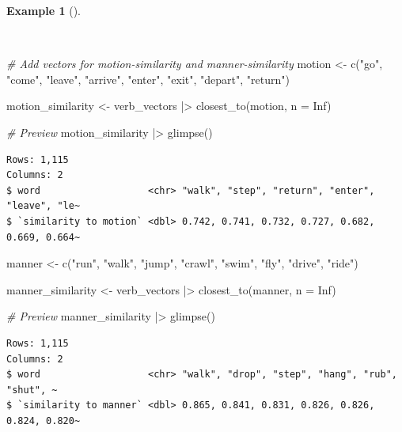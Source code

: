 \documentclass[
  letterpaper,
]{book}
\newenvironment{Shaded}{\begin{snugshade}}{\end{snugshade}}
\newcommand{\AttributeTok}[1]{\textcolor[rgb]{0.00,0.00,0.00}{#1}}
\newcommand{\CommentTok}[1]{\textcolor[rgb]{0.00,0.00,0.00}{\textit{#1}}}
\newcommand{\ConstantTok}[1]{\textcolor[rgb]{0.00,0.00,0.00}{#1}}
\newcommand{\FunctionTok}[1]{\textcolor[rgb]{0.00,0.00,0.00}{#1}}
\newcommand{\NormalTok}[1]{\textcolor[rgb]{0.00,0.00,0.00}{#1}}
\newcommand{\OtherTok}[1]{\textcolor[rgb]{0.00,0.00,0.00}{#1}}
\newcommand{\SpecialCharTok}[1]{\textcolor[rgb]{0.00,0.00,0.00}{#1}}
\newcommand{\StringTok}[1]{\textcolor[rgb]{0.00,0.00,0.00}{#1}}
\theoremstyle{definition}
\newtheorem{example}{Example}[chapter]
\theoremstyle{remark}
\begin{document}
\begin{example}[]\protect\hypertarget{exm-explore-masc-vsm-word2vec-manner-motion}{}\label{exm-explore-masc-vsm-word2vec-manner-motion}

~

\begin{Shaded}
\begin{Highlighting}[]
\CommentTok{\# Add vectors for motion{-}similarity and manner{-}similarity}
\NormalTok{motion }\OtherTok{\textless{}{-}}
  \FunctionTok{c}\NormalTok{(}\StringTok{"go"}\NormalTok{, }\StringTok{"come"}\NormalTok{, }\StringTok{"leave"}\NormalTok{, }\StringTok{"arrive"}\NormalTok{, }\StringTok{"enter"}\NormalTok{, }\StringTok{"exit"}\NormalTok{, }\StringTok{"depart"}\NormalTok{, }\StringTok{"return"}\NormalTok{)}

\NormalTok{motion\_similarity }\OtherTok{\textless{}{-}}
\NormalTok{  verb\_vectors }\SpecialCharTok{|\textgreater{}} \FunctionTok{closest\_to}\NormalTok{(motion, }\AttributeTok{n =} \ConstantTok{Inf}\NormalTok{)}

\CommentTok{\# Preview}
\NormalTok{motion\_similarity }\SpecialCharTok{|\textgreater{}} \FunctionTok{glimpse}\NormalTok{()}
\end{Highlighting}
\end{Shaded}

\begin{verbatim}
Rows: 1,115
Columns: 2
$ word                   <chr> "walk", "step", "return", "enter", "leave", "le~
$ `similarity to motion` <dbl> 0.742, 0.741, 0.732, 0.727, 0.682, 0.669, 0.664~
\end{verbatim}

\begin{Shaded}
\begin{Highlighting}[]
\NormalTok{manner }\OtherTok{\textless{}{-}}
  \FunctionTok{c}\NormalTok{(}\StringTok{"run"}\NormalTok{, }\StringTok{"walk"}\NormalTok{, }\StringTok{"jump"}\NormalTok{, }\StringTok{"crawl"}\NormalTok{, }\StringTok{"swim"}\NormalTok{, }\StringTok{"fly"}\NormalTok{, }\StringTok{"drive"}\NormalTok{, }\StringTok{"ride"}\NormalTok{)}

\NormalTok{manner\_similarity }\OtherTok{\textless{}{-}}
\NormalTok{  verb\_vectors }\SpecialCharTok{|\textgreater{}} \FunctionTok{closest\_to}\NormalTok{(manner, }\AttributeTok{n =} \ConstantTok{Inf}\NormalTok{)}

\CommentTok{\# Preview}
\NormalTok{manner\_similarity }\SpecialCharTok{|\textgreater{}} \FunctionTok{glimpse}\NormalTok{()}
\end{Highlighting}
\end{Shaded}

\begin{verbatim}
Rows: 1,115
Columns: 2
$ word                   <chr> "walk", "drop", "step", "hang", "rub", "shut", ~
$ `similarity to manner` <dbl> 0.865, 0.841, 0.831, 0.826, 0.826, 0.824, 0.820~
\end{verbatim}

\end{example}
\end{document}
